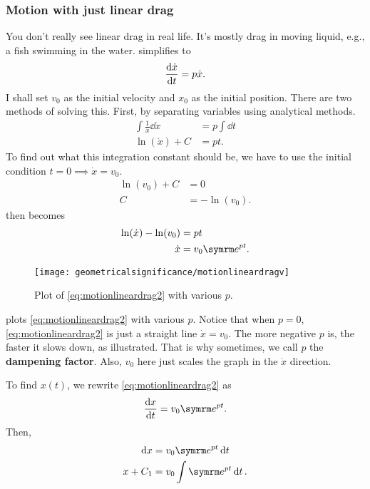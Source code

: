 \subsubsection{Motion with just linear drag}

You don't really see linear drag in real life. It's mostly drag in moving liquid, e.g., a fish swimming in the water.  simplifies to
\begin{equation*}
    \dv{\dot{x}}{t} = p\dot{x}.
\end{equation*}
I shall set $v_0$ as the initial velocity and $x_0$ as the initial position. There are two methods of solving this. First, by separating variables using analytical methods.
\begin{align}
    \int\frac{1}{\dot{x}}\dd{\dot{x}} &= p\int\dd{t} \nonumber\\
    \ln(\dot{x}) + C &= pt. \label{eq:motionlineardrag1}
\end{align}
To find out what this integration constant should be, we have to use the initial condition $t = 0 \implies \dot{x} = v_0$.
\begin{align*}
    \ln(v_0) + C &= 0 \\
    C &= -\ln(v_0).
\end{align*}
 then becomes
\begin{align}
    \ln(\dot{x}) - \ln(v_0) &= pt \nonumber\\
    \dot{x} &= v_0\e^{pt}. \label{eq:motionlineardrag2}
\end{align}

\begin{figure}
    \centering
    \texttt{[image: geometricalsignificance/motionlineardragv]}
    \caption{Plot of \cref{eq:motionlineardrag2} with various $p$.}
    \label{fig:motionlineardragv}
\end{figure}
 plots \cref{eq:motionlineardrag2} with various $p$. Notice that when $p = 0$, \cref{eq:motionlineardrag2} is just a straight line $\dot{x} = v_0$. The more negative $p$ is, the faster it slows down, as illustrated. That is why sometimes, we call $p$ the \textbf{dampening factor}. Also, $v_0$ here just scales the graph in the $\dot{x}$ direction.

To find $x(t)$, we rewrite \cref{eq:motionlineardrag2} as
\begin{equation*}
    \dv{x}{t} = v_0\e^{pt}.
\end{equation*}
Then,
\begin{align}
    \dd{x} &= v_0\e^{pt}\dd{t} \\
    x + C_1 &= v_0\int \e^{pt}\dd{t}. \label{eq:motionlineardrag3}
\end{align}

